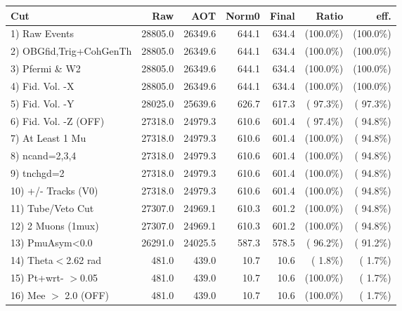  \begin{table}[h!]\centering
 \begin{tabular}{||l||r|r|r|r|r|r||}
 \hline
 \hline
 Cut & Raw & AOT & Norm0 & Final & Ratio & eff.       \\
 \hline
  1) Raw Events           &      28805.0 &      26349.6 &        644.1 &        634.4 & (100.0\%) & (100.0\%) \\
  2) OBGfid,Trig+CohGenTh &      28805.0 &      26349.6 &        644.1 &        634.4 & (100.0\%) & (100.0\%) \\
  3) Pfermi \& W2         &      28805.0 &      26349.6 &        644.1 &        634.4 & (100.0\%) & (100.0\%) \\
  4) Fid. Vol. -X         &      28805.0 &      26349.6 &        644.1 &        634.4 & (100.0\%) & (100.0\%) \\
  5) Fid. Vol. -Y         &      28025.0 &      25639.6 &        626.7 &        617.3 & ( 97.3\%) & ( 97.3\%) \\
  6) Fid. Vol. -Z (OFF)   &      27318.0 &      24979.3 &        610.6 &        601.4 & ( 97.4\%) & ( 94.8\%) \\
  7) At Least 1 Mu        &      27318.0 &      24979.3 &        610.6 &        601.4 & (100.0\%) & ( 94.8\%) \\
  8) ncand=2,3,4          &      27318.0 &      24979.3 &        610.6 &        601.4 & (100.0\%) & ( 94.8\%) \\
  9) tnchgd=2             &      27318.0 &      24979.3 &        610.6 &        601.4 & (100.0\%) & ( 94.8\%) \\
 10) +/- Tracks (V0)      &      27318.0 &      24979.3 &        610.6 &        601.4 & (100.0\%) & ( 94.8\%) \\
 11) Tube/Veto Cut        &      27307.0 &      24969.1 &        610.3 &        601.2 & (100.0\%) & ( 94.8\%) \\
 12) 2 Muons (1mux)       &      27307.0 &      24969.1 &        610.3 &        601.2 & (100.0\%) & ( 94.8\%) \\
 13) PmuAsym<0.0          &      26291.0 &      24025.5 &        587.3 &        578.5 & ( 96.2\%) & ( 91.2\%) \\
 14) Theta$<$2.62 rad     &        481.0 &        439.0 &         10.7 &         10.6 & (  1.8\%) & (  1.7\%) \\
 15) Pt+wrt- $>$0.05      &        481.0 &        439.0 &         10.7 &         10.6 & (100.0\%) & (  1.7\%) \\
 16) Mee $>$ 2.0  (OFF)   &        481.0 &        439.0 &         10.7 &         10.6 & (100.0\%) & (  1.7\%) \\

\end{tabular}
\end{table}
